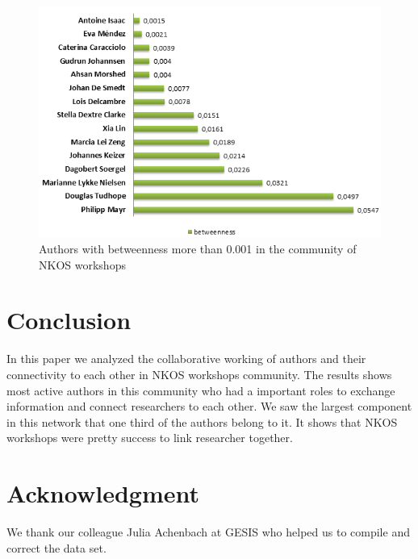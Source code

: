 \documentclass[runningheads,a4paper]{llncs}
\begin{document}
\begin{figure}
\centering
\includegraphics[width=0.8\linewidth]{betweenness}
\caption{Authors with betweenness more than 0.001 in the community of NKOS workshops}
\label{fig:betweenness}
\end{figure}




\section{Conclusion}\label{concl}
In this paper we analyzed the collaborative working of authors and their connectivity to each other in NKOS workshops community. The results shows most active authors in this community who had a important roles to exchange information and connect researchers to each other. We saw the largest component in this network that one third of the authors belong to it. It shows that NKOS workshops were pretty success to link researcher together.  


\section{Acknowledgment}\label{sec:ACKNOWLEDGMENTS}
We thank our colleague Julia Achenbach at GESIS who helped us to compile and correct the data set.


 
\end{document}
